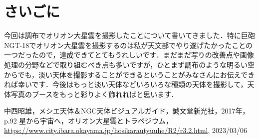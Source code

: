 \documentclass[../../super_nova_2023]{subfiles}
\begin{document}
\section{さいごに}
今回は調布でオリオン大星雲を撮影したことについて書いてきました．特に巨砲NGT-18でオリオン大星雲を撮影するのは私が天文部でやり遂げたかったことの一つだったので，達成できてとてもうれしいです．まだまだ写りの改善点や画像処理の分野などで取り組むべき点も多いですが，ひとまず調布のような明るい空からでも，淡い天体を撮影することができるということがみなさんにお伝えできれば幸いです．今後はもっと淡い天体などいろいろな種類の天体を撮影して，天体写真のブースをもっと彩りよく飾れればと思います．
\begin{thebibliography}{1}
	 中西昭雄，メシエ天体＆NGC天体ビジュアルガイド，誠文堂新光社，2017年，p.92
	 星から宇宙へ，オリオン大星雲とトラペジウム，\url{https://www.city.ibara.okayama.jp/hosikarautyuuhe/R2/r3.2.html}, 2023/03/06
\end{thebibliography}
\end{document}

